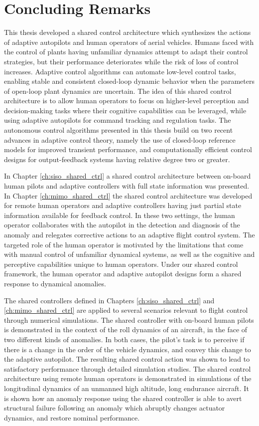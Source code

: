 \chapter{Concluding Remarks} \label{ch:conclusion}

This thesis developed a shared control architecture which synthesizes the actions of adaptive autopilots and human operators of aerial vehicles. Humans faced with the control of plants having unfamiliar dynamics attempt to adapt their control strategies, but their performance deteriorates while the risk of loss of control increases. Adaptive control algorithms can automate low-level control tasks, enabling stable and consistent closed-loop dynamic behavior when the parameters of open-loop plant dynamics are uncertain. The idea of this shared control architecture is to allow human operators to focus on higher-level perception and decision-making tasks where their cognitive capabilities can be leveraged, while using adaptive autopilots for command tracking and regulation tasks. The autonomous control algorithms presented in this thesis build on two recent advances in adaptive control theory, namely the use of closed-loop reference models for improved transient performance, and computationally efficient control designs for output-feedback systems having relative degree two or greater. 

In Chapter \ref{ch:siso_shared_ctrl} a shared control architecture between on-board human pilots and adaptive controllers with full state information was presented. In Chapter \ref{ch:mimo_shared_ctrl} the shared control architecture was developed for remote human operators and adaptive controllers having just partial state information available for feedback control. In these two settings, the human operator collaborates with the autopilot in the detection and diagnosis of the anomaly and relegates corrective actions to an adaptive flight control system. The targeted role of the human operator is motivated by the limitations that come with manual control of unfamiliar dynamical systems, as well as the cognitive and perceptive capabilities unique to human operators. Under our shared control framework, the human operator and adaptive autopilot designs form a shared response to dynamical anomalies. 

The shared controllers defined in Chapters \ref{ch:siso_shared_ctrl} and \ref{ch:mimo_shared_ctrl} are applied to several scenarios relevant to flight control through numerical simulations. The shared controller with on-board human pilots is demonstrated in the context of the roll dynamics of an aircraft, in the face of two different kinds of anomalies. In both cases, the pilot's task is to perceive if there is a change in the order of the vehicle dynamics, and convey this change to the adaptive autopilot. The resulting shared control action was shown to lead to satisfactory performance through detailed simulation studies. The shared control architecture using remote human operators is demonstrated in simulations of the longitudinal dynamics of an unmanned high altitude, long endurance aircraft. It is shown how an anomaly response using the shared controller is able to avert structural failure following an anomaly which abruptly changes actuator dynamics, and restore nominal performance.

